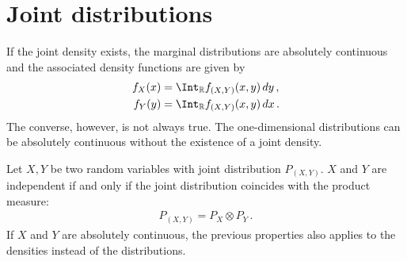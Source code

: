 \section{Joint distributions}


    \begin{result}
        If the joint density exists, the marginal distributions are absolutely continuous and the associated density functions are given by
        \begin{align}
            f_X(x) &= \Int_{\mathbb{R}}f_{(X,Y)}(x,y)\,dy\,,\\
            f_Y(y) &= \Int_{\mathbb{R}}f_{(X,Y)}(x,y)\,dx\,.
        \end{align}
        The converse, however, is not always true. The one-dimensional distributions can be absolutely continuous without the existence of a joint density.
    \end{result}

    \begin{property}[Independence]\label{prob:independent_densities}
        Let $X,Y$ be two random variables with joint distribution $P_{(X,Y)}$. $X$ and $Y$ are independent if and only if the joint distribution coincides with the product measure:
        \begin{gather}
            P_{(X,Y)} = P_X\otimes P_Y\,.
        \end{gather}
        If $X$ and $Y$ are absolutely continuous, the previous properties also applies to the densities instead of the distributions.
    \end{property}

